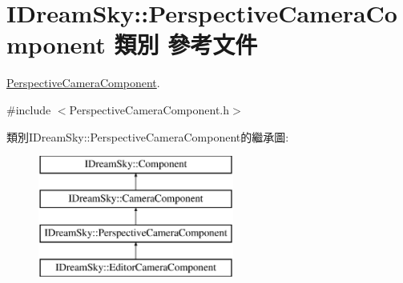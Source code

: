 \hypertarget{class_i_dream_sky_1_1_perspective_camera_component}{}\section{I\+Dream\+Sky\+:\+:Perspective\+Camera\+Component 類別 參考文件}
\label{class_i_dream_sky_1_1_perspective_camera_component}


\hyperlink{class_i_dream_sky_1_1_perspective_camera_component}{Perspective\+Camera\+Component}.  




{\ttfamily \#include $<$Perspective\+Camera\+Component.\+h$>$}

類別\+I\+Dream\+Sky\+:\+:Perspective\+Camera\+Component的繼承圖\+:\begin{figure}[H]
\begin{center}
\leavevmode
\includegraphics[height=4.000000cm]{class_i_dream_sky_1_1_perspective_camera_component}
\end{center}
\end{figure}
